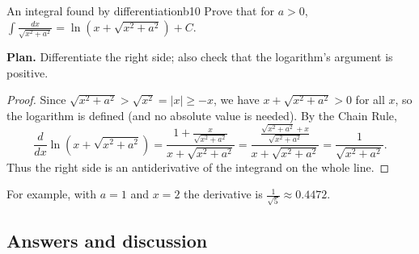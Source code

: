 \documentclass[11pt]{article}
\begin{document}
\begin{exmp}{An integral found by differentiation}{b10}
Prove that for $a>0$, $\displaystyle\int\frac{dx}{\sqrt{x^2+a^2}}=\ln\left(x+\sqrt{x^2+a^2}\right)+C$.

\textbf{Plan.} Differentiate the right side; also check that the logarithm's argument is positive.

\begin{proof}
Since $\sqrt{x^2+a^2}>\sqrt{x^2}=\lvert x\rvert\ge-x$, we have $x+\sqrt{x^2+a^2}>0$ for all $x$, so the logarithm is defined (and no absolute value is needed). By the Chain Rule,
\[\frac{d}{dx}\ln\left(x+\sqrt{x^2+a^2}\right)=\frac{1+\frac{x}{\sqrt{x^2+a^2}}}{x+\sqrt{x^2+a^2}}=\frac{\frac{\sqrt{x^2+a^2}+x}{\sqrt{x^2+a^2}}}{x+\sqrt{x^2+a^2}}=\frac1{\sqrt{x^2+a^2}} .\]
Thus the right side is an antiderivative of the integrand on the whole line.
\end{proof}
For example, with $a=1$ and $x=2$ the derivative is $\frac1{\sqrt5}\approx0.4472$.
\end{exmp}

\subsection*{Answers and discussion}
\end{document}
